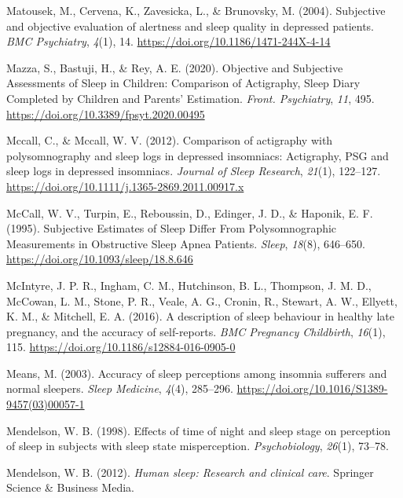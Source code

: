 \documentclass[
]{article}
\newlength{\cslhangindent}
\newenvironment{CSLReferences}[2] %
 {\begin{list}{}{%
  \setlength{\itemindent}{0pt}
  \setlength{\leftmargin}{0pt}
  \setlength{\parsep}{0pt}
  \ifodd #1
   \setlength{\leftmargin}{\cslhangindent}
   \setlength{\itemindent}{-1\cslhangindent}
  \fi
  \setlength{\itemsep}{#2\baselineskip}}}
 {\end{list}}
\begin{document}
\begin{CSLReferences}{1}{0}
Matousek, M., Cervena, K., Zavesicka, L., \& Brunovsky, M. (2004). Subjective and objective evaluation of alertness and sleep quality in depressed patients. \emph{BMC Psychiatry}, \emph{4}(1), 14. \url{https://doi.org/10.1186/1471-244X-4-14}

Mazza, S., Bastuji, H., \& Rey, A. E. (2020). Objective and {Subjective} {Assessments} of {Sleep} in {Children}: {Comparison} of {Actigraphy}, {Sleep} {Diary} {Completed} by {Children} and {Parents}' {Estimation}. \emph{Front. Psychiatry}, \emph{11}, 495. \url{https://doi.org/10.3389/fpsyt.2020.00495}

Mccall, C., \& Mccall, W. V. (2012). Comparison of actigraphy with polysomnography and sleep logs in depressed insomniacs: {Actigraphy}, {PSG} and sleep logs in depressed insomniacs. \emph{Journal of Sleep Research}, \emph{21}(1), 122--127. \url{https://doi.org/10.1111/j.1365-2869.2011.00917.x}

McCall, W. V., Turpin, E., Reboussin, D., Edinger, J. D., \& Haponik, E. F. (1995). Subjective {Estimates} of {Sleep} {Differ} {From} {Polysomnographic} {Measurements} in {Obstructive} {Sleep} {Apnea} {Patients}. \emph{Sleep}, \emph{18}(8), 646--650. \url{https://doi.org/10.1093/sleep/18.8.646}

McIntyre, J. P. R., Ingham, C. M., Hutchinson, B. L., Thompson, J. M. D., McCowan, L. M., Stone, P. R., Veale, A. G., Cronin, R., Stewart, A. W., Ellyett, K. M., \& Mitchell, E. A. (2016). A description of sleep behaviour in healthy late pregnancy, and the accuracy of self-reports. \emph{BMC Pregnancy Childbirth}, \emph{16}(1), 115. \url{https://doi.org/10.1186/s12884-016-0905-0}

Means, M. (2003). Accuracy of sleep perceptions among insomnia sufferers and normal sleepers. \emph{Sleep Medicine}, \emph{4}(4), 285--296. \url{https://doi.org/10.1016/S1389-9457(03)00057-1}

Mendelson, W. B. (1998). Effects of time of night and sleep stage on perception of sleep in subjects with sleep state misperception. \emph{Psychobiology}, \emph{26}(1), 73--78.

Mendelson, W. B. (2012). \emph{Human sleep: Research and clinical care}. Springer Science \& Business Media.


\end{CSLReferences}
\end{document}
